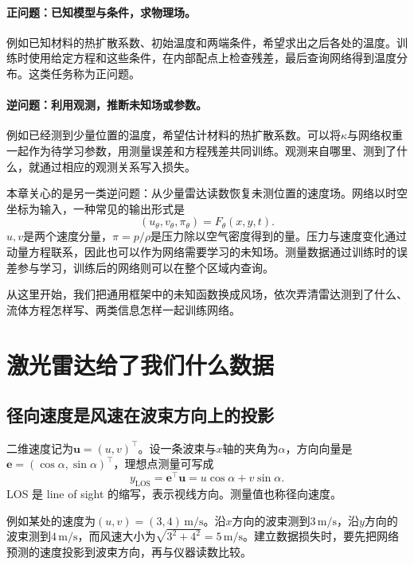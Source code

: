 \paragraph{正问题：已知模型与条件，求物理场。}
例如已知材料的热扩散系数、初始温度和两端条件，希望求出之后各处的温度。训练时使用给定方程和这些条件，在内部配点上检查残差，最后查询网络得到温度分布。这类任务称为正问题。

\paragraph{逆问题：利用观测，推断未知场或参数。}
例如已经测到少量位置的温度，希望估计材料的热扩散系数。可以将$\kappa$与网络权重一起作为待学习参数，用测量误差和方程残差共同训练。观测来自哪里、测到了什么，就通过相应的观测关系写入损失\cite{raissi2019pinn}。

本章关心的是另一类逆问题：从少量雷达读数恢复未测位置的速度场。网络以时空坐标为输入，一种常见的输出形式是
\begin{equation}
 (u_\theta,v_\theta,\pi_\theta)=F_\theta(x,y,t).
 \label{eq:pinn-coordinate-network}
\end{equation}
$u,v$是两个速度分量，$\pi=p/\rho$是压力除以空气密度得到的量。压力与速度变化通过动量方程联系，因此也可以作为网络需要学习的未知场。测量数据通过训练时的误差参与学习，训练后的网络则可以在整个区域内查询。

从这里开始，我们把通用框架中的未知函数换成风场，依次弄清雷达测到了什么、流体方程怎样写、两类信息怎样一起训练网络。

\section{激光雷达给了我们什么数据}
\label{sec:pinn-lidar}

\subsection{径向速度是风速在波束方向上的投影}
二维速度记为$\mathbf u=(u,v)^\top$。设一条波束与$x$轴的夹角为$\alpha$，方向向量是$\mathbf e=(\cos\alpha,\sin\alpha)^\top$，理想点测量可写成
\begin{equation}
 y_{\mathrm{LOS}}=\mathbf e^\top\mathbf u
 =u\cos\alpha+v\sin\alpha.
 \label{eq:pinn-observation}
\end{equation}
LOS 是 line of sight 的缩写，表示视线方向。测量值也称径向速度。

例如某处的速度为$(u,v)=(3,4)\,\mathrm{m/s}$。沿$x$方向的波束测到$3\,\mathrm{m/s}$，沿$y$方向的波束测到$4\,\mathrm{m/s}$，而风速大小为$\sqrt{3^2+4^2}=5\,\mathrm{m/s}$。建立数据损失时，要先把网络预测的速度投影到波束方向，再与仪器读数比较。

